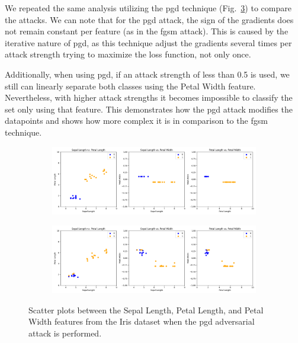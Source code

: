 We repeated the same analysis utilizing the \ac{pgd}
technique (Fig.~\ref{fig:adv-pgd}) to compare the attacks.
We can note that for the \ac{pgd} attack, the sign
of the gradients does not remain constant per
feature (as in the \ac{fgsm} attack). This is caused
by the iterative nature of \ac{pgd}, as this technique
adjust the gradients several times per attack strength
trying to maximize the loss function, not only once. \

Additionally, when using \ac{pgd}, if an attack
strength of less than 0.5 is used, we still can
linearly separate both classes using the Petal Width
feature. Nevertheless, with higher attack strengths
it becomes impossible to classify the set only using
that feature. This demonstrates how the \ac{pgd}
attack modifies the datapoints and shows how more
complex it is in comparison to the \ac{fgsm} technique. \

\begin{figure}[!h]
  \centering

  \begin{subfigure}{\textwidth}
      \includegraphics[width=\linewidth]{figures/adversarial_analysis/adversarial-pgd-0.1.png}
      \label{fig:adv6}
  \end{subfigure}

  \begin{subfigure}{\textwidth}
    \includegraphics[width=\linewidth]{figures/adversarial_analysis/adversarial-pgd-0.3.png}
    \label{fig:adv7}
  \end{subfigure}

  \caption{Scatter plots between the Sepal Length, Petal Length, and Petal Width features from the Iris dataset when the \ac{pgd} adversarial attack is performed.}
  \label{fig:adv-pgd}
\end{figure} \


